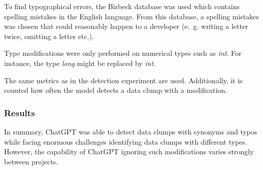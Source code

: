 To find typographical errors, the Birbeck database \cite{birbeck} was used which contains spelling mistakes in the English language. From this database, a spelling mistakes was chosen that could reasonably happen to a developer (e.~g. writing a letter twice, omitting a letter etc.). 

Type modifications were only performed on numerical types such as \textit{int}. For instance,  the type \textit{long} might be replaced by \textit{int}. 

The same metrics as in the detection experiment are used. Additionally, it is counted how often the model detects a data clump with a modification. 





\subsubsection{Results}

In summary, ChatGPT was able to detect data clumps with synonyms and typos while facing enormous challenges identifying data clumps with different types. However, the capability of ChatGPT ignoring such modifications varies strongly between projects. 

